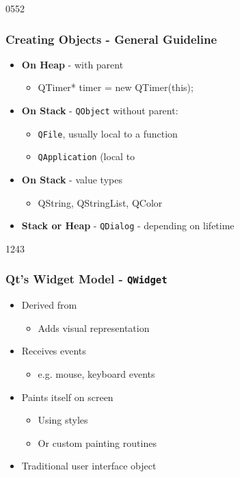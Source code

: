 \begin{slide}[fragile]{0552}\frametitle{Creating Objects - General Guideline}
 \begin{itemize}

 \item \textbf{On Heap} -  with parent
   \begin{itemize}
   \item[]
   \begin{cpp}
QTimer* timer = new QTimer(this);
    \end{cpp}
   \end{itemize}\medskip

    \item \textbf{On Stack} - \texttt{QObject} without parent:
    \begin{itemize}
    \item \texttt{QFile}, usually local to a function
    \item \texttt{QApplication} (local to 
    \end{itemize}
    \medskip

\item \textbf{On Stack} - value types
    \begin{itemize}
    \item QString, QStringList, QColor
   \end{itemize}\medskip

\item \textbf{Stack or Heap} - \texttt{QDialog} - depending on lifetime 
  \end{itemize}
\end{slide}


\begin{slide}{1243}
  \frametitle{Qt's Widget Model - \texttt{QWidget}}
  \begin{itemize}
 \item Derived from 
    \begin{itemize}
    \item Adds visual representation
    \end{itemize}\medskip
  \item Receives events
    \begin{itemize}
    \item e.g. mouse, keyboard events
    \end{itemize}\medskip
  \item Paints itself on screen
    \begin{itemize}
    \item Using styles
    \item Or custom painting routines
    \end{itemize}
  \item Traditional user interface object
\end{itemize}
\end{slide}

